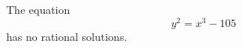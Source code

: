 \begin{proposition}
    The equation
\[
    y^2=x^3-105
\]
    has no rational solutions.
\end{proposition}

